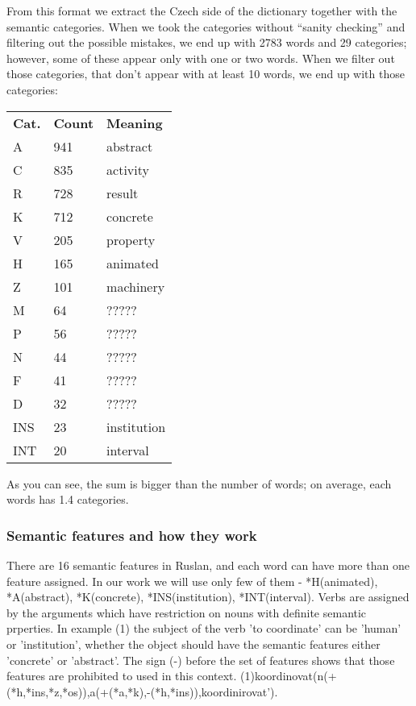 \documentclass[letterpaper]{article}
\begin{document}
From this format we extract the Czech side of the dictionary together with the semantic categories. When we took the categories without ``sanity checking'' and filtering out the possible mistakes, we end up with 2783 words and 29 categories; however, some of these appear only with one or two words. When we filter out those categories, that don't appear with at least 10 words, we end up with those categories:

\begin{tabular}{|l|l|l|}
 
\hline
\textbf{Cat.} &  \textbf{Count} & \textbf{Meaning}\\
A & 941 & abstract \\ \hline
C & 835 & activity \\ \hline
R & 728 & result \\ \hline
K & 712 & concrete \\ \hline
V & 205 & property \\ \hline
H & 165 & animated \\ \hline
Z & 101 & machinery \\ \hline
M & 64 & ????? \\ \hline
P & 56 & ????? \\ \hline
N & 44 & ????? \\ \hline
F & 41 & ????? \\ \hline
D & 32 & ????? \\ \hline
INS & 23 & institution \\ \hline
INT & 20 & interval \\ 
\hline
\end{tabular}

As you can see, the sum is bigger than the number of words; on average, each words has 1.4 categories.


\subsubsection{Semantic features and how they work}
There are 16 semantic features in Ruslan, and each word can have more than one
feature assigned. In our work we will use only few of them - *H(animated), *A(abstract),
*K(concrete), *INS(institution), *INT(interval). Verbs are assigned by the arguments
which have restriction on nouns with definite semantic prperties. In example (1)
the subject of the verb 'to coordinate' can be 'human' or 'institution', whether
the object should have the semantic features either 'concrete' or 'abstract'. The sign (-)
before the set of features shows that those features are prohibited to used in this context.
(1)koordinovat(n(+(*h,*ins,*z,*os)),a(+(*a,*k),-(*h,*ins)),koordinirovat').
\end{document}
